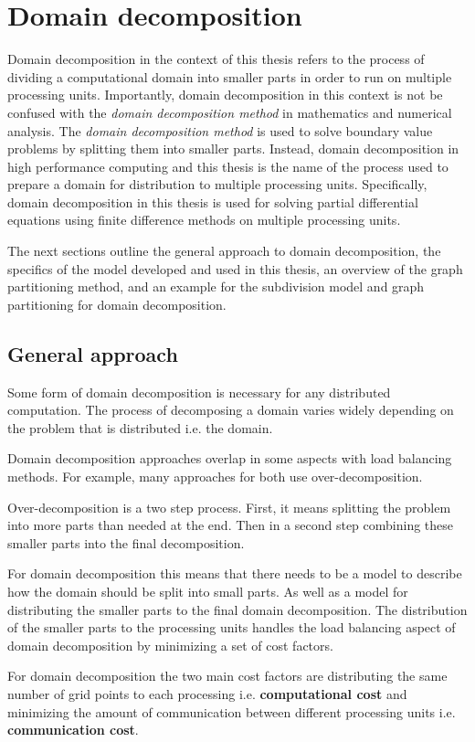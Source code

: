 \section{Domain decomposition}
Domain decomposition in the context of this thesis refers to the process of dividing a computational domain into smaller parts in order to run on multiple processing units.
Importantly, domain decomposition in this context is not be confused with the \textit{domain decomposition method} in mathematics and numerical analysis.
The \textit{domain decomposition method} is used to solve boundary value problems by splitting them into smaller parts.
Instead, domain decomposition in high performance computing and this thesis is the name of the process used to prepare a domain for distribution to multiple processing units.
Specifically, domain decomposition in this thesis is used for solving partial differential equations using finite difference methods on multiple processing units.

The next sections outline the general approach to domain decomposition, the specifics of the model developed and used in this thesis, an overview of the graph partitioning method, and an example for the subdivision model and graph partitioning for domain decomposition.

\subsection{General approach}
Some form of domain decomposition is necessary for any distributed computation.
The process of decomposing a domain varies widely depending on the problem that is distributed i.e. the domain.

Domain decomposition approaches overlap in some aspects with load balancing methods.
For example, many approaches for both use over-decomposition.

Over-decomposition is a two step process.
First, it means splitting the problem into more parts than needed at the end.
Then in a second step combining these smaller parts into the final decomposition.

For domain decomposition this means that there needs to be a model to describe how the domain should be split into small parts.
As well as a model for distributing the smaller parts to the final domain decomposition.
The distribution of the smaller parts to the processing units handles the load balancing aspect of domain decomposition by minimizing a set of cost factors.

For domain decomposition the two main cost factors are distributing the same number of grid points to each processing i.e. \textbf{computational cost} and minimizing the amount of communication between different processing units i.e. \textbf{communication cost}.

